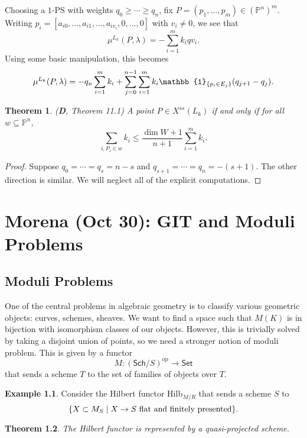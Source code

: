 \documentclass[leqno, openany]{memoir}
\newtheorem{thm}{Theorem}[section]
\theoremstyle{definition}
\newtheorem{exm}[thm]{Example}
\theoremstyle{remark}
\theoremstyle{plain}
\theoremstyle{definition}
\theoremstyle{remark}
\renewcommand{\P}{\mathbb{P}}
\newcommand{\mr}[1]{\mathrm{#1}}
\newcommand{\ms}[1]{\mathsf{#1}}
\begin{document}
Choosing a $1$-PS with weights $q_0 \geq \cdots \geq q_n$, fix $P = (p_1, \ldots, p_m) \in (\P^n)^m$. Writing $p_i = [a_{i0}, \ldots, a_{i1}, \ldots, a_{iv_i}, 0, \ldots, 0]$ with $v_i \neq 0$, we see that 
\[ \mu^{L_k}(P, \lambda) = - \sum_{i=1}^m k_i qv_i. \]
Using some basic manipulation, this becomes
\[ \mu^{L_k}(P, \lambda) = -q_n \sum_{i=1}^m k_i + \sum_{j=0}^{n-1} \sum_{i=1}^m k_i \mathbb{1}_{\qty{p_i \in E_j}} ( q_{j+1} - q_j ). \]

\begin{thm}(\textbf{D}, Theorem 11.1)
    A point $P \in X^{ss}(L_k)$ if and only if for all $w \subseteq \P^n$,
    \[ \sum_{i, P_i \in w} k_i \leq \frac{\dim W + 1}{n+1} \sum_{i=1}^m k_i. \]
\end{thm}

\begin{proof}
    Suppose $q_0 = \cdots = q_s = n-s$ and $q_{s+1} = \cdots = q_n = -(s+1)$. The other direction is similar. We will neglect all of the explicit computations.
\end{proof}

\chapter{Morena (Oct 30): GIT and Moduli Problems}%
\label{sec:morena_oct_30_git_and_moduli_problems}

\section{Moduli Problems}%
\label{sec:moduli_problems}

One of the central problems in algebraic geometry is to classify various geometric objects: curves, schemes, sheaves. We want to find a space such that $M(K)$ is in bijection with isomorphism classes of our objects. However, this is trivially solved by taking a disjoint union of points, so we need a stronger notion of moduli problem. This is given by a functor
\[ M \colon (\ms{Sch}/S)^{\mr{op}} \to \ms{Set} \]
that sends a scheme $T$ to the set of families of objects over $T$.

\begin{exm}
    Consider the Hilbert functor $\mr{Hilb}_{M/R}$ that sends a scheme $S$ to 
    \[ \qty{X \subset M_S \mid X \to S \text{ flat and finitely presented}}. \]
\end{exm}

\begin{thm}
    The Hilbert functor is represented by a quasi-projected scheme.
\end{thm}
\end{document}
